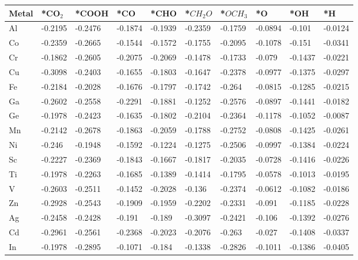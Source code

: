 \begin{table}[h]
  \centering
  {\fontsize{6}{12}\selectfont
  \begin{tabular}{*{10}{l}}
      \hline
      Metal & *CO$_2$ & *COOH & *CO & *CHO & *$CH_2O$ & *$OCH_3$ & *O & *OH & *H \\
      \hline
      Al & -0.2195 & -0.2476 & -0.1874 & -0.1939 & -0.2359 & -0.1759 & -0.0894 & -0.101  & -0.0124 \\
      Co & -0.2359 & -0.2665 & -0.1544 & -0.1572 & -0.1755 & -0.2095 & -0.1078 & -0.151  & -0.0341 \\
      Cr & -0.1862 & -0.2605 & -0.2075 & -0.2069 & -0.1478 & -0.1733 & -0.079  & -0.1437 & -0.0221 \\
      Cu & -0.3098 & -0.2403 & -0.1655 & -0.1803 & -0.1647 & -0.2378 & -0.0977 & -0.1375 & -0.0297 \\
      Fe & -0.2184 & -0.2028 & -0.1676 & -0.1797 & -0.1742 & -0.264  & -0.0815 & -0.1285 & -0.0215 \\
      Ga & -0.2602 & -0.2558 & -0.2291 & -0.1881 & -0.1252 & -0.2576 & -0.0897 & -0.1441 & -0.0182 \\
      Ge & -0.1978 & -0.2423 & -0.1635 & -0.1802 & -0.2104 & -0.2364 & -0.1178 & -0.1052 & -0.0087 \\
      Mn & -0.2142 & -0.2678 & -0.1863 & -0.2059 & -0.1788 & -0.2752 & -0.0808 & -0.1425 & -0.0261 \\
      Ni & -0.246  & -0.1948 & -0.1592 & -0.1224 & -0.1275 & -0.2506 & -0.0997 & -0.1384 & -0.0224 \\
      Sc & -0.2227 & -0.2369 & -0.1843 & -0.1667 & -0.1817 & -0.2035 & -0.0728 & -0.1416 & -0.0226 \\
      Ti & -0.1978 & -0.2263 & -0.1685 & -0.1389 & -0.1414 & -0.1795 & -0.0578 & -0.1013 & -0.0195 \\
      V  & -0.2603 & -0.2511 & -0.1452 & -0.2028 & -0.136  & -0.2374 & -0.0612 & -0.1082 & -0.0186 \\
      Zn & -0.2928 & -0.2543 & -0.1909 & -0.1959 & -0.2202 & -0.2331 & -0.091  & -0.1185 & -0.0228 \\
      Ag & -0.2458 & -0.2428 & -0.191  & -0.189  & -0.3097 & -0.2421 & -0.106  & -0.1392 & -0.0276 \\
      Cd & -0.2961 & -0.2561 & -0.2368 & -0.2023 & -0.2076 & -0.263  & -0.027  & -0.1408 & -0.0337 \\
      In & -0.1978 & -0.2895 & -0.1071 & -0.184  & -0.1338 & -0.2826 & -0.1011 & -0.1386 & -0.0405 \\

\end{tabular}}
\end{table}
